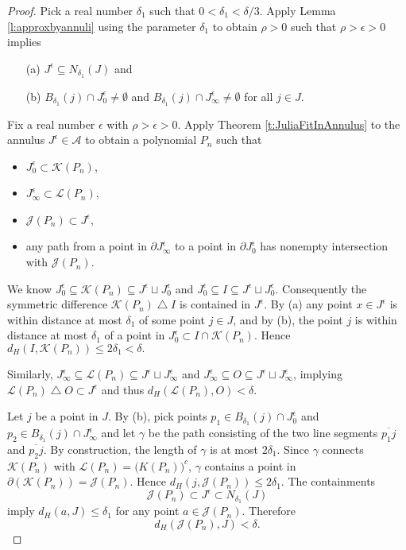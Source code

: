 \documentclass[a4paper,11pt,onecolumn]{amsart}
\theoremstyle{definition}
\begin{document}
\begin{proof}
Pick a real number $\delta_1$ such that $0< \delta_1 < \delta/3$.  Apply Lemma \ref{l:approxbyannuli} using the parameter $\delta_1$ to obtain $\rho>0$ such that $\rho > \epsilon > 0$ implies 
\begin{enumerate}
\item[(a)]  $J^{\epsilon} \subseteq N_{\delta_1}(J)$ and 
\item[(b)]  $B_{\delta_1}(j) \cap J^{\epsilon}_0 \not = \emptyset$ and $B_{\delta_1}(j) \cap J^{\epsilon}_{\infty} \not = \emptyset$ for all $j \in J$.
\end{enumerate}
Fix a real number $\epsilon$ with $\rho > \epsilon >0$.  Apply Theorem \ref{t:JuliaFitInAnnulus} to the annulus $J^{\epsilon} \in \mathcal{A}$  to obtain a polynomial $P_n$ such that 
\begin{itemize}
\item $J^{\epsilon}_0 \subset \mathcal{K}(P_n)$,
\item $J^{\epsilon}_{\infty} \subset \mathcal{L}(P_n)$, 
\item $\mathcal{J}(P_n) \subset J^{\epsilon}$, 
\item any path from a point in $\partial J^{\epsilon}_{\infty}$ to a point in $\partial J^{\epsilon}_0$ has nonempty intersection with $\mathcal{J}(P_n)$.  
\end{itemize}

We know $J^{\epsilon}_0 \subseteq \mathcal{K}(P_n) \subseteq J^{\epsilon} \sqcup J^{\epsilon}_0$ and $J^{\epsilon}_0 \subseteq I \subseteq J^{\epsilon} \sqcup J^{\epsilon}_0$.  Consequently the symmetric difference $\mathcal{K}(P_n) \bigtriangleup I$ is contained in $J^{\epsilon}$.  By (a) any point $x \in J^{\epsilon}$ is within distance at most $\delta_1$ of some point $j \in J$, and by (b), the point $j$ is within distance at most $\delta_1$ of a point in $J_0^{\epsilon} \subset I \cap \mathcal{K}(P_n)$.  Hence $d_H(I,\mathcal{K}(P_n)) \leq 2\delta_1 < \delta.$  

Similarly, $J^{\epsilon}_{\infty} \subseteq \mathcal{L}(P_n) \subseteq J^{\epsilon} \sqcup J^{\epsilon}_{\infty}$ and $J^{\epsilon}_{\infty} \subseteq O \subseteq J^{\epsilon} \sqcup J^{\epsilon}_{\infty}$, implying $\mathcal{L}(P_n) \bigtriangleup O \subset J^{\epsilon}$ and thus $d_H(\mathcal{L}(P_n),O) < \delta$. 

Let $j$ be a point in $J$.  By (b), pick points  $p_1 \in B_{\delta_1}(j) \cap J^{\epsilon}_0$ and $p_2 \in B_{\delta_1}(j) \cap J^{\epsilon}_{\infty}$ and let $\gamma$ be the path consisting of the two line segments $\overline{p_1j}$ and $\overline{p_2j}$.  By construction, the length of $\gamma$ is at most $2\delta_1$.  Since $\gamma$ connects $\mathcal{K}(P_n)$ with $\mathcal{L}(P_n) = \mathcal({K}(P_n))^c$, $\gamma$ contains a point in $\partial(\mathcal{K}(P_n)) = \mathcal{J}(P_n)$.  Hence $d_H(j,\mathcal{J}(P_n)) \leq 2\delta_1$.  The containments 
$$\mathcal{J}(P_n) \subset J^{\epsilon} \subset N_{\delta_1}(J)$$
imply $d_H(a,J) \leq \delta_1$ for any point $a \in \mathcal{J}(P_n)$.  Therefore $$d_H(\mathcal{J}(P_n),J) < \delta.$$
\end{proof}
\end{document}
